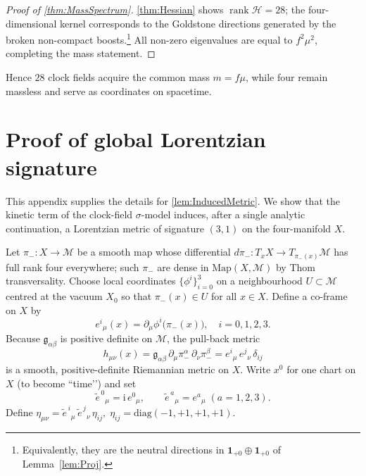 \documentclass[pdflatex,sn-mathphys-num]{sn-jnl}
\theoremstyle{thmstyleone}
\theoremstyle{thmstyletwo}%
\theoremstyle{thmstylethree}%
\begin{document}
\begin{appendices}
\begin{proof}[Proof of \autoref{thm:MassSpectrum}]
\autoref{thm:Hessian} shows
\(\operatorname{rank}\mathcal H=28\); the four-dimensional kernel
corresponds to the Goldstone directions generated by the broken
non-compact boosts.\footnote{%
  Equivalently, they are the neutral directions in
  $\mathbf{1}_{+0}\oplus\mathbf{1}_{+0}$ of Lemma~\ref{lem:Proj}.}
All non-zero eigenvalues are equal to \(f^{2}\mu^{2}\), completing the
mass statement.
\end{proof}

Hence $28$ clock fields acquire the common mass
\(m=f\mu\), while four remain massless and serve as coordinates on
spacetime.

\section{Proof of global Lorentzian signature}
\label{app:Lorentz}
This appendix supplies the details for \autoref{lem:InducedMetric}.
We show that the kinetic term of the clock-field $\sigma$-model induces,
after a single analytic continuation, a Lorentzian metric of signature
\((3,1)\) on the four-manifold \(X\).

Let
\(
  \pi_-:X\to\mathcal M
\)
be a smooth map whose differential
\(
  d\pi_-:T_{x}X\to T_{\pi_-(x)}\mathcal M
\)
has full rank four everywhere; such $\pi_-$ are dense in
\(\mathrm{Map}(X,\mathcal M)\) by Thom transversality.
Choose local coordinates
\(\{\phi^{i}\}_{i=0}^{3}\) on a neighbourhood
\(U\subset\mathcal M\) centred at the vacuum \(X_{0}\) so that
\(\pi_-(x)\in U\) for all \(x\in X\).  
Define a co-frame on \(X\) by
\[
  e^{i}{}_{\mu}(x)=\partial_{\mu}\phi^{i}\bigl(\pi_-(x)\bigr),
  \quad i=0,1,2,3.
\]
Because \(\mathfrak g_{\alpha\beta}\) is positive definite on
\(\mathcal M\), the pull-back metric
\begin{equation}
  h_{\mu\nu}(x)
  =\mathfrak g_{\alpha\beta}\,
     \partial_{\mu}\pi_-^{\alpha}\,
     \partial_{\nu}\pi_-^{\beta}
  =e^{i}{}_{\mu}\,e^{j}{}_{\nu}\,\delta_{ij}
\label{eq:hdef}
\end{equation}
is a smooth, positive-definite Riemannian metric on \(X\).
Write \(x^{0}\) for one chart on \(X\) (to become “time’’) and set
\begin{equation}\label{eq:wick}
  \tilde e^{\,0}{}_{\mu}=\mathrm{i}\,e^{0}{}_{\mu},
  \qquad
  \tilde e^{\,a}{}_{\mu}=e^{a}{}_{\mu}\;(a=1,2,3).
\end{equation}
Define
\(
  \eta_{\mu\nu}
  =\tilde e^{\,i}{}_{\mu}\,\tilde e^{\,j}{}_{\nu}\,\eta_{ij},
  \;
  \eta_{ij}=\mathrm{diag}(-1,+1,+1,+1).
\)


\end{appendices}
\end{document}
